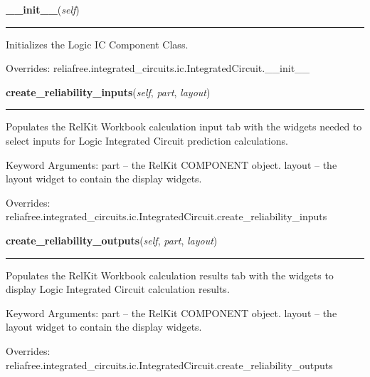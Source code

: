 \hspace{.8\funcindent}\begin{boxedminipage}{\funcwidth}

    \raggedright \textbf{\_\_init\_\_}(\textit{self})

    \vspace{-1.5ex}

    \rule{\textwidth}{0.5\fboxrule}
\setlength{\parskip}{2ex}
    Initializes the Logic IC Component Class.

\setlength{\parskip}{1ex}
      Overrides: reliafree.integrated\_circuits.ic.IntegratedCircuit.\_\_init\_\_

    \end{boxedminipage}

    \vspace{0.5ex}

\hspace{.8\funcindent}\begin{boxedminipage}{\funcwidth}

    \raggedright \textbf{create\_reliability\_inputs}(\textit{self}, \textit{part}, \textit{layout})

    \vspace{-1.5ex}

    \rule{\textwidth}{0.5\fboxrule}
\setlength{\parskip}{2ex}
    Populates the RelKit Workbook calculation input tab with the widgets
    needed to select inputs for Logic Integrated Circuit prediction 
    calculations.

    Keyword Arguments: part   -- the RelKit COMPONENT object. layout -- 
    the layout widget to contain the display widgets.

\setlength{\parskip}{1ex}
      Overrides: reliafree.integrated\_circuits.ic.IntegratedCircuit.create\_reliability\_inputs

    \end{boxedminipage}

    \vspace{0.5ex}

\hspace{.8\funcindent}\begin{boxedminipage}{\funcwidth}

    \raggedright \textbf{create\_reliability\_outputs}(\textit{self}, \textit{part}, \textit{layout})

    \vspace{-1.5ex}

    \rule{\textwidth}{0.5\fboxrule}
\setlength{\parskip}{2ex}
    Populates the RelKit Workbook calculation results tab with the 
    widgets to display Logic Integrated Circuit calculation results.

    Keyword Arguments: part   -- the RelKit COMPONENT object. layout -- 
    the layout widget to contain the display widgets.

\setlength{\parskip}{1ex}
      Overrides: reliafree.integrated\_circuits.ic.IntegratedCircuit.create\_reliability\_outputs

    \end{boxedminipage}

